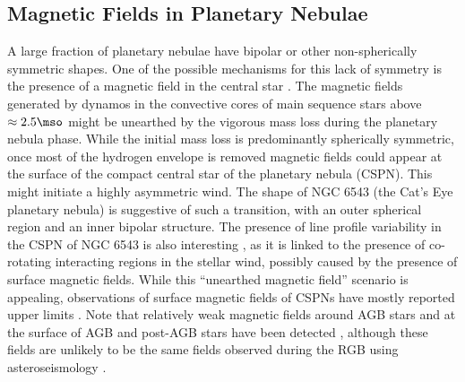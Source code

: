 \subsection{Magnetic Fields in Planetary Nebulae}
A large fraction of planetary nebulae have bipolar or other non-spherically symmetric shapes. 
One of the possible mechanisms for this lack of symmetry is the presence of a magnetic field in the central star \citep[see e.g.][]{Garc_a_Segura_1997,Chevalier_1994}. The magnetic fields generated by dynamos in the convective cores of main sequence stars above $\approx 2.5\mso$ might be unearthed by the vigorous mass loss during the planetary nebula phase. While the initial mass loss is predominantly spherically symmetric, once most of the hydrogen envelope is removed magnetic fields could appear at the surface of the compact central star of the planetary nebula (CSPN). This might initiate a highly asymmetric wind. The shape of NGC 6543 (the Cat's Eye planetary nebula) is suggestive of such a transition, with an outer spherical region and an inner bipolar structure. The presence of line profile variability in the CSPN of NGC 6543 is also interesting \citep{Prinja_2012}, as it is linked to the presence of co-rotating interacting regions in the stellar wind, possibly caused by the presence of surface magnetic fields. While this ``unearthed magnetic field'' scenario is appealing, observations of surface magnetic fields of CSPNs have mostly reported upper limits \citep{Jordan_2012,Leone_2014,Asensio_Ramos_2014}. Note that relatively weak  magnetic fields around AGB stars \citep{Leal_Ferreira_2013} and at the surface of AGB and post-AGB stars have been detected \citep{L_bre_2014,Sabin_2014}, although these fields are unlikely to be the same fields observed during the RGB using asteroseismology \citep{Fuller_2015}. %


